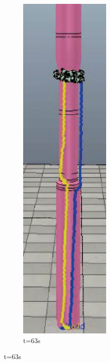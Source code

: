 \begin{figure}[htbp]
	\begin{subfigure}{0.3\textwidth}{
			\centering
			\includegraphics[height=0.18\textheight,width=0.5\textwidth]{figure/chap05/BSB/1m27s.eps}
			\caption{t=63s}
		}
	\end{subfigure}

\end{figure}
